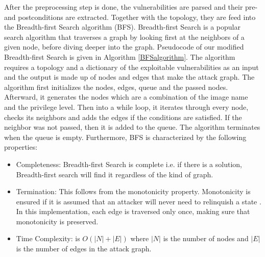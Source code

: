 After the preprocessing step is done, the vulnerabilities are parsed and their pre- and postconditions are extracted. Together with the topology, they are feed into the Breadth-first Search algorithm (BFS).
Breadth-first Search is a popular search algorithm that traverses a graph by looking first at the neighbors of a given node, before diving deeper into the graph. Pseudocode of our modified Breadth-first Search is given in Algorithm \ref{BFSalgorithm}. The algorithm requires a topology and a dictionary of the exploitable vulnerabilities as an input and the output is made up of nodes and edges that make the attack graph. The algorithm first initializes the nodes, edges, queue and the passed nodes. Afterward, it generates the nodes which are a combination of the image name and the privilege level. Then into a while loop, it iterates through every node, checks its neighbors and adds the edges if the conditions are satisfied. If the neighbor was not passed, then it is added to the queue. The algorithm terminates when the queue is empty. Furthermore, BFS is characterized by the following properties:

\begin{itemize}
	\item Completeness: Breadth-first Search is complete i.e. if there is a solution, Breadth-first search will find it regardless of the kind of graph.
	\item Termination: This follows from the monotonicity property. Monotonicity is ensured if it is assumed that an attacker will
	never need to relinquish a state \cite{ingols2006practical, ou2006scalable, ammann2002scalable}. In this implementation, each edge is traversed only once, making sure that monotonicity is preserved.
	\item Time Complexity: is $O(|N| + |E|)$ where $|N|$ is the number of nodes and $|E|$ is the number of edges in the attack graph.
\end{itemize}